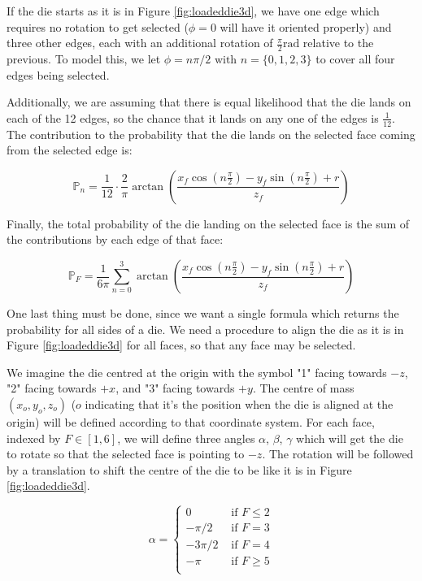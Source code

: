 \documentclass[english,12pt,a4paper,final]{article}
\begin{document}
If the die starts as it is in Figure \ref{fig:loadeddie3d}, we have one edge which requires no rotation to get selected ($\phi=0$ will have it oriented properly) and three other edges, each with an additional rotation of $\frac{\pi}{2} \text{rad}$ relative to the previous. To model this, we let $\phi = n\pi/2 \text{ with } n=\{0, 1, 2, 3\}$ to cover all four edges being selected.

Additionally, we are assuming that there is equal likelihood that the die lands on each of the 12 edges, so the chance that it lands on any one of the edges is $\frac{1}{12}$. The contribution to the probability that the die lands on the selected face coming from the selected edge is:

\begin{equation*}
	\mathbb{P}_n = \frac{1}{12} \cdot \frac{2}{\pi} \arctan\left(\frac{x_f\cos(n\frac{\pi}{2})-y_f\sin(n\frac{\pi}{2})+r}{z_f}\right)
\end{equation*}

Finally, the total probability of the die landing on the selected face is the sum of the contributions by each edge of that face:

\begin{equation}\label{dieFaceProb}
	\mathbb{P}_F = \frac{1}{6\pi} \sum_{n=0}^{3} \arctan\left(\frac{x_f\cos(n\frac{\pi}{2})-y_f\sin(n\frac{\pi}{2})+r}{z_f}\right)
\end{equation}

One last thing must be done, since we want a single formula which returns the probability for all sides of a die. We need a procedure to align the die as it is in Figure \ref{fig:loadeddie3d} for all faces, so that any face may be selected.

We imagine the die centred at the origin with the symbol "1" facing towards $-z$, "2" facing towards $+x$, and "3" facing towards $+y$. The centre of mass $(x_o, y_o, z_o)$ ($o$ indicating that it's the position when the die is aligned at the origin) will be defined according to that coordinate system. For each face, indexed by $F \in [1, 6] $, we will define three angles $\alpha$, $\beta$, $\gamma$ which will get the die to rotate so that the selected face is pointing to $-z$. The rotation will be followed by a translation to shift the centre of the die to be like it is in Figure \ref{fig:loadeddie3d}.

\begin{equation*}
	\alpha = \begin{cases} 
		0 & \text{ if } F \le 2 \\
		-\pi/2 & \text{ if } F = 3 \\
		-3\pi/2 & \text{ if } F = 4 \\
		-\pi & \text{ if } F \ge 5  \\
	\end{cases}
\end{equation*}
\end{document}
